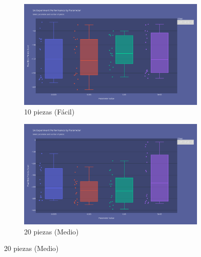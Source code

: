 \documentclass[11pt,spanish,listoffigures,listoftables]{tfgetsinf}
\begin{document}
\begin{figure}[H]
    \centering
    \begin{subfigure}[b]{0.48\textwidth}
        \centering
        \includegraphics[width=\textwidth]{images/SA_np-10_updatefactor.png}
        \caption{10 piezas (Fácil)}
        \label{fig:sa_np10_updatefactor}
    \end{subfigure}
    \hfill
    \begin{subfigure}[b]{0.48\textwidth}
        \centering
        \includegraphics[width=\textwidth]{images/SA_np-20_updatefactor.png}
        \caption{20 piezas (Medio)}
        \label{fig:sa_np20_updatefactor}
    \end{subfigure}
    
    \vspace{0.5cm}
    

\end{figure}
\end{document}
